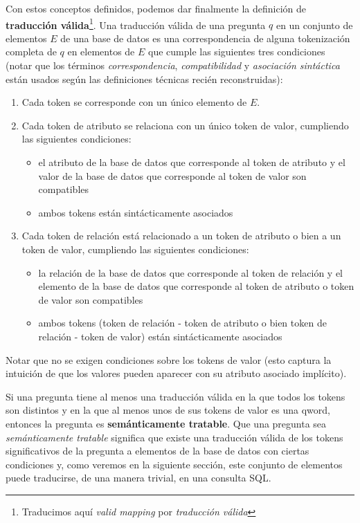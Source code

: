 Con estos conceptos definidos, podemos dar finalmente la definición de \textbf{traducción válida}\footnote{Traducimos aquí \textit{valid mapping} por \textit{traducción válida}}. Una traducción válida de una pregunta $q$ en un conjunto de elementos $E$ de una base de datos es una correspondencia de alguna tokenización completa de $q$ en elementos de $E$ que cumple las siguientes tres condiciones (notar que los términos \textit{correspondencia}, \textit{compatibilidad} y \textit{asociación sintáctica} están usados según las definiciones técnicas recién reconstruidas):
\begin{enumerate}
  \item Cada token se corresponde con un único elemento de $E$.
  \item Cada token de atributo se relaciona con un único token de valor, cumpliendo las siguientes condiciones:
  \begin{itemize}
    \item el atributo de la base de datos que corresponde al token de atributo y el valor de la base de datos que corresponde al token de valor son compatibles
    \item ambos tokens están sintácticamente asociados
   \end{itemize}
  \item Cada token de relación está relacionado a un token de atributo o bien a un token de valor, cumpliendo las siguientes condiciones:
  \begin{itemize}
    \item la relación de la base de datos que corresponde al token de relación y el elemento de la base de datos que corresponde al token de atributo o token de valor son compatibles
    \item ambos tokens (token de relación - token de atributo o bien token de relación - token de valor) están sintácticamente asociados
  \end{itemize}
\end{enumerate}

Notar que no se exigen condiciones sobre los tokens de valor (esto captura la intuición de que los valores pueden aparecer con su atributo asociado implícito).

Si una pregunta tiene al menos una traducción válida en la que todos los tokens son distintos y en la que al menos unos de sus tokens de valor es una qword, entonces la pregunta es \textbf{semánticamente tratable}. Que una pregunta sea \textit{semánticamente tratable} significa que existe una traducción válida de los tokens significativos de la pregunta a elementos de la base de datos con ciertas condiciones y, como veremos en la siguiente sección, este conjunto de elementos puede traducirse, de una manera trivial, en una consulta SQL.

